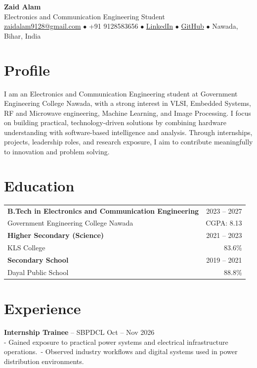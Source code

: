 \documentclass[11pt,a4paper]{article}
\begin{document}
\begin{center}
    {\LARGE\bfseries Zaid Alam}\\[4pt]
    {\large Electronics and Communication Engineering Student}\\[6pt]
    \href{mailto:zaidalam9128@gmail.com}{zaidalam9128@gmail.com} $\bullet$
    +91 9128583656 $\bullet$
    \href{https://www.linkedin.com/in/zaid-alam-05a7b7293}{LinkedIn} $\bullet$
    \href{https://github.com/mdzaid-alam}{GitHub} $\bullet$
    Nawada, Bihar, India
\end{center}

\section*{Profile}
I am an Electronics and Communication Engineering student at Government Engineering College Nawada, with a strong interest in VLSI, Embedded Systems, RF and Microwave engineering, Machine Learning, and Image Processing. I focus on building practical, technology-driven solutions by combining hardware understanding with software-based intelligence and analysis. Through internships, projects, leadership roles, and research exposure, I aim to contribute meaningfully to innovation and problem solving.

\section*{Education}
\begin{tabularx}{\linewidth}{@{}X r@{}}
\textbf{B.Tech in Electronics and Communication Engineering} & 2023 -- 2027 \\
Government Engineering College Nawada & CGPA: 8.13 \\
\textbf{Higher Secondary (Science)} & 2021 -- 2023 \\
KLS College & 83.6\% \\
\textbf{Secondary School} & 2019 -- 2021 \\
Dayal Public School & 88.8\% \\
\end{tabularx}

\section*{Experience}
\textbf{Internship Trainee} -- SBPDCL \hfill Oct -- Nov 2026\\
- Gained exposure to practical power systems and electrical infrastructure operations.\
- Observed industry workflows and digital systems used in power distribution environments.\\
\end{document}
